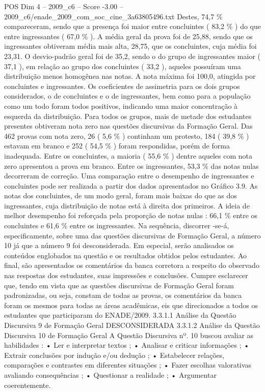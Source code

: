 \begin{textsample}{POS Dim 4 – 2009\_c6 – Score -3.00 – 2009\_c6/enade\_2009\_com\_soc\_cine\_3a63805496.txt}
Destes, 74,7 \% compareceram, sendo que a presença foi maior entre concluintes ( 83,2 \% ) do que entre ingressantes ( 67,0 \% ).
A média geral da prova foi de 25,88, sendo que os ingressantes obtiveram média mais alta, 28,75, que os concluintes, cuja média foi 23,31.
O desvio-padrão geral foi de 35,2, sendo o do grupo de ingressantes maior ( 37,1 ), em relação ao grupo dos concluintes ( 33,2 ), aqueles possuíram uma distribuição menos homogênea nas notas.
A nota máxima foi 100,0, atingida por concluintes e ingressantes.
Os coeficientes de assimetria para os dois grupos considerados, o de concluintes e o de ingressantes, bem como para a população como um todo foram todos positivos, indicando uma maior concentração à esquerda da distribuição.
Para todos os grupos, mais de metade dos estudantes presentes obtiveram nota zero nas questões discursivas da Formação Geral.
Das 462 provas com nota zero, 26 ( 5,6 \% ) continham um protesto, 184 ( 39,8 \% ) estavam em branco e 252 ( 54,5 \% ) foram respondidas, porém de forma inadequada.
Entre os concluintes, a maioria ( 55,6 \% ) dentre aqueles com nota zero apresentou a prova em branco.
Entre os ingressantes, 53,3 \% das notas nulas decorreram de correção.
Uma comparação entre o desempenho de ingressantes e concluintes pode ser realizada a partir dos dados apresentados no Gráfico 3.9.
As notas dos concluintes, de um modo geral, foram mais baixas do que as dos ingressantes, cuja distribuição de notas está à direita dos primeiros.
A ideia de melhor desempenho foi reforçada pela proporção de notas nulas : 66,1 \% entre os concluintes e 61,6 \% entre os ingressantes.
Na sequência, discorrer -se-á, especificamente, sobre uma das questões discursivas de Formação Geral, a número 10 já que a número 9 foi desconsiderada.
Em especial, serão analisados os conteúdos englobados na questão e os resultados obtidos pelos estudantes.
Ao final, são apresentados os comentários da banca corretora a respeito do observado nas respostas dos estudantes, suas impressões e conclusões.
Cumpre esclarecer que, tendo em vista que as questões discursivas de Formação Geral foram padronizadas, ou seja, constam de todas as provas, os comentários da banca foram os mesmos para todas as áreas acadêmicas, eis que direcionados a todos os estudantes que participaram do ENADE/2009. 3.3.1.1 Análise da Questão Discursiva 9 de Formação Geral DESCONSIDERADA 3.3.1.2 Análise da Questão Discursiva 10 de Formação Geral A Questão Discursiva nº. 10 buscou avaliar as habilidades : • Ler e interpretar textos ; • Analisar e criticar informações ; • Extrair conclusões por indução e/ou dedução ; • Estabelecer relações, comparações e contrastes em diferentes situações ; • Fazer escolhas valorativas avaliando consequências ; • Questionar a realidade ; • Argumentar coerentemente.

\end{textsample}
